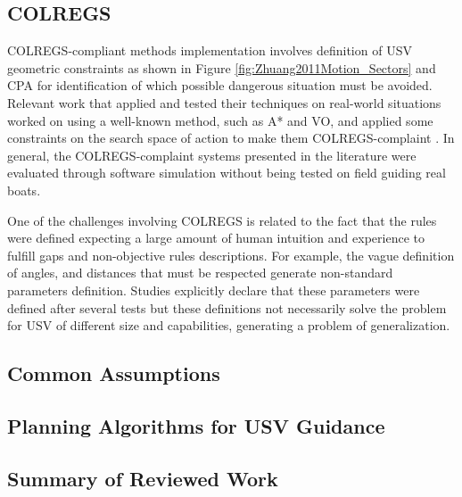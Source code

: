     \subsection{COLREGS}
    \ac{COLREGS}-compliant methods implementation involves definition of USV geometric constraints as shown in Figure \ref{fig:Zhuang2011Motion_Sectors} and \acf{CPA} for identification of which possible dangerous situation must be avoided. 
    Relevant work that applied and tested their techniques on real-world situations worked on using a well-known method, such as A* and \ac{VO}, and applied some constraints on the search space of action to make them \ac{COLREGS}-complaint \cite{Kuwata2014Safe, Campbell2013Automatic}. 
    In general, the \ac{COLREGS}-complaint systems presented in the literature were evaluated through software simulation without being tested on field guiding real boats.
    
    One of the challenges involving \ac{COLREGS} is related to the fact that the rules were defined expecting a large amount of human intuition and experience to fulfill gaps and non-objective rules descriptions. 
    For example, the vague definition of angles, and distances that must be respected generate non-standard parameters definition. Studies explicitly declare that these parameters were defined after several tests \cite{Larson2007Advances} but these definitions not necessarily solve the problem for \ac{USV} of different size and capabilities, generating a problem of generalization.
    
    
    \subsection{Common Assumptions}
    \subsection{Planning Algorithms for USV Guidance}
    \subsection{Summary of Reviewed Work}